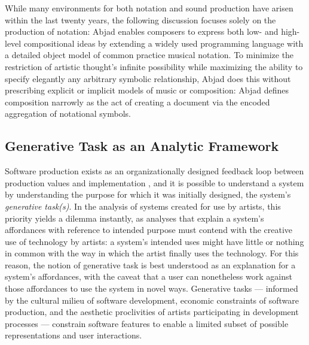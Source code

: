 \documentclass{article}
\begin{document}
While many environments for both notation and sound production have arisen
within the last twenty years, the following discussion focuses solely on the
production of notation: Abjad enables composers to express both low- and
high-level compositional ideas by extending a widely used programming language
with a detailed object model of common practice musical
notation. To minimize the restriction of artistic thought's infinite
possibility while maximizing the ability to specify elegantly any arbitrary
symbolic relationship, Abjad does this without prescribing explicit or implicit
models of music or composition: Abjad defines composition narrowly as the act
of creating a document via the encoded aggregation of notational symbols.

\subsection{Generative Task as an Analytic Framework}

Software production exists as an organizationally designed feedback loop
between production values and implementation \cite{Derniame:1999fk}, and it is
possible to understand a system by understanding the purpose for which it was
initially designed, the system's \emph{generative task(s)}. In the analysis of
systems created for use by artists, this priority yields a dilemma instantly,
as analyses that explain a system's affordances with reference to intended
purpose must contend with the creative use of technology by artists: a system's
intended uses might have little or nothing in common with the way in which the
artist finally uses the technology. For this reason, the notion of generative
task is best understood as an explanation for a system's affordances, with the
caveat that a user can nonetheless work against those affordances to use the
system in novel ways. Generative tasks --- informed by the cultural milieu of
software development, economic constraints of software production, and the
aesthetic proclivities of artists participating in development processes ---
constrain software features to enable a limited subset of possible
representations and user interactions.
\end{document}
